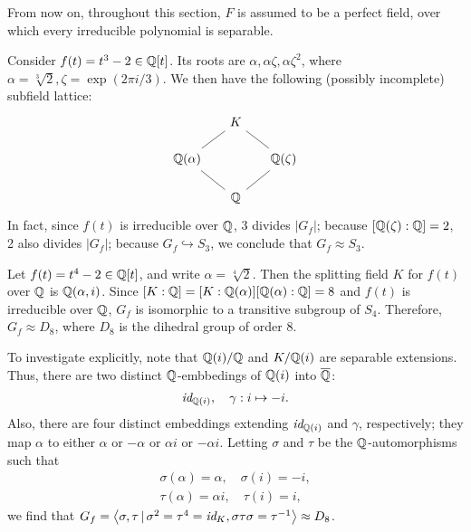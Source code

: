 From now on, throughout this section, $F$ is assumed to be a perfect field, over which every irreducible polynomial is separable.

\begin{exmp}
    Consider $f(t)=t^3-2\in{\mathbb{Q}}[t]$.
    Its roots are $\alpha, \alpha\zeta, \alpha\zeta^2$, where $\alpha=\sqrt[3]{2}, \zeta=\exp(2\pi i/3)$.
    We then have the following (possibly incomplete) subfield lattice:
    \begin{equation*}
    \begin{tikzcd}[row sep=0.5cm, column sep=0.5cm]
        &
        K
            \arrow[dl, dash]
            \arrow[dr, dash]
        &
        \\
        \bb{Q}(\alpha)
            \arrow[dr, dash]
        &
        &
        \bb{Q}(\zeta)
            \arrow[dl, dash]
        \\
        &
        \bb{Q}
        &
    \end{tikzcd}
    \end{equation*}
    In fact, since $f(t)$ is irreducible over ${\mathbb{Q}}$, 3 divides $|G_f|$; because $[{\mathbb{Q}}(\zeta):{\mathbb{Q}}]=2$, 2 also divides $|G_f|$; because $G_f\hookrightarrow S_3$, we conclude that $G_f\approx S_3$.
\end{exmp}
\begin{exmp}
    Let $f(t)=t^4-2\in{\mathbb{Q}}[t]$, and write $\alpha=\sqrt[4]{2}$.
    Then the splitting field $K$ for $f(t)$ over ${\mathbb{Q}}$ is ${\mathbb{Q}}(\alpha, i)$.
    Since $[K:{\mathbb{Q}}]=[K:{\mathbb{Q}}(\alpha)][{\mathbb{Q}}(\alpha):{\mathbb{Q}}]=8$ and $f(t)$ is irreducible over ${\mathbb{Q}}$, $G_f$ is isomorphic to a transitive subgroup of $S_4$.
    Therefore, $G_f\approx D_8$, where $D_8$ is the dihedral group of order 8.

    To investigate explicitly, note that ${\mathbb{Q}}(i)/{\mathbb{Q}}$ and $K/{\mathbb{Q}}(i)$ are separable extensions.
    Thus, there are two distinct ${\mathbb{Q}}$-embbedings of ${\mathbb{Q}}(i)$ into $\overline{{\mathbb{Q}}}$:
    \begin{align*}
        \textit{id}_{{\mathbb{Q}}(i)},\quad\gamma: i\mapsto -i.
    \end{align*}
    Also, there are four distinct embeddings extending $\textit{id}_{{\mathbb{Q}}(i)}$ and $\gamma$, respectively; they map $\alpha$ to either $\alpha$ or $-\alpha$ or $\alpha i$ or $-\alpha i$.
    Letting $\sigma$ and $\tau$ be the ${\mathbb{Q}}$-automorphisms such that
    \begin{align*}
        \sigma(\alpha)=\alpha,\quad \sigma(i)=-i,\\
        \tau(\alpha)=\alpha i,\quad \tau(i)=i,
    \end{align*}
    we find that $G_f={\left\langle{\sigma, \tau\,|\,\sigma^2=\tau^4=\textit{id}_{K}, \sigma\tau\sigma=\tau^{-1}}\right\rangle}\approx D_8$.
\end{exmp}
